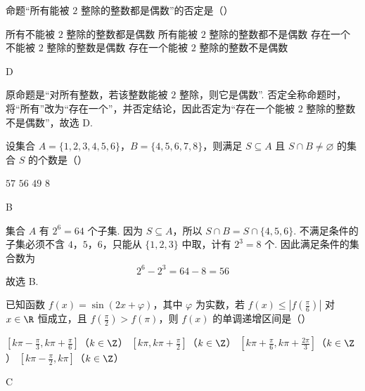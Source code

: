 \begin{problem}
命题“所有能被 \(2\) 整除的整数都是偶数”的否定是（\quad）

\choices
    {所有不能被 \(2\) 整除的整数都是偶数}
    {所有能被 \(2\) 整除的整数都不是偶数}
    {存在一个不能被 \(2\) 整除的整数是偶数}
    {存在一个能被 \(2\) 整除的整数不是偶数}
\end{problem}

\begin{answer}
D
\end{answer}

\begin{solution}
原命题是“对所有整数，若该整数能被 \(2\) 整除，则它是偶数”. 否定全称命题时，将“所有”改为“存在一个”，并否定结论，因此否定为“存在一个能被 \(2\) 整除的整数不是偶数”，故选 D.
\end{solution}

\begin{problem}
设集合 \(A = \{1, 2, 3, 4, 5, 6\}\)，\(B = \{4, 5, 6, 7, 8\}\)，则满足 \(S \subseteq A\) 且 \(S \cap B \neq \varnothing\) 的集合 \(S\) 的个数是（\quad）

\choices
    {\(57\)}
    {\(56\)}
    {\(49\)}
    {\(8\)}
\end{problem}

\begin{answer}
B
\end{answer}

\begin{solution}
集合 \(A\) 有 \(2^6=64\) 个子集. 因为 \(S\subseteq A\)，所以 \(S\cap B=S\cap\{4,5,6\}\). 不满足条件的子集必须不含 \(4\)，\(5\)，\(6\)，只能从 \(\{1,2,3\}\) 中取，计有 \(2^3=8\) 个. 因此满足条件的集合数为
\[
2^6-2^3=64-8=56
\]
故选 B.
\end{solution}

\begin{problem}
已知函数 \( f(x) = \sin (2x + \varphi) \)，其中 \( \varphi \) 为实数，若 \( f(x) \leqslant \left|f\left(\frac{\pi}{6}\right)\right| \) 对 \( x \in \R \) 恒成立，且 \( f\left(\frac{\pi}{2}\right) > f(\pi) \)，则 \( f(x) \) 的单调递增区间是（\quad）

\choices
    {\(\left[k\pi - \frac{\pi}{3}, k\pi + \frac{\pi}{6}\right]\)（\(k \in \Z\)）}
    {\(\left[k\pi, k\pi + \frac{\pi}{2}\right]\)（\(k \in \Z\)）}
    {\(\left[k\pi + \frac{\pi}{6}, k\pi + \frac{2\pi}{3}\right]\)（\(k \in \Z\)）}
    {\(\left[k\pi - \frac{\pi}{2}, k\pi\right]\)（\(k \in \Z\)）}
\end{problem}

\begin{answer}
C
\end{answer}

